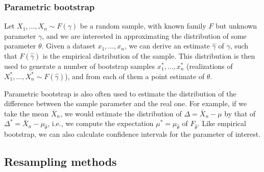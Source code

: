 \subsubsection{Parametric bootstrap}

Let $X_1, \ldots, X_n \sim F(\gamma)$ be a random sample, with known family $F$ but unknown parameter $\gamma$, and we are interested in approximating the distribution of some parameter $\theta$. Given a dataset $x_1, \ldots, x_n$, we can derive an estimate $\hat{\gamma}$ of $\gamma$, such that $F(\hat{\gamma})$ is the empirical distribution of the sample. This distribution is then used to generate a number of bootstrap samples $x_1^*, \ldots, x_n^*$ (realizations of $X_1^*, \ldots, X_n^* \sim F(\hat{\gamma})$), and from each of them a point estimate of $\theta$.

Parametric bootstrap is also often used to estimate the distribution of the difference between the sample parameter and the real one. For example, if we take the mean $\bar{X}_n$, we would estimate the distribution of $\Delta = \bar{X}_n - \mu$ by that of $\Delta^* = \bar{X}_n - \mu_{\hat{\theta}}$, i.e., we compute the expectation $\mu^* = \mu_{\hat{\theta}}$ of $F_{\hat{\theta}}$. Like empirical bootstrap, we can also calculate confidence intervals for the parameter of interest.

\subsection{Resampling methods}

